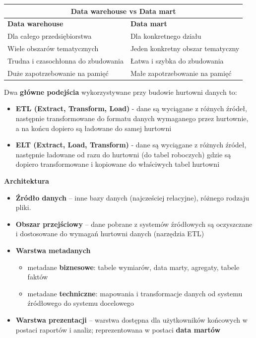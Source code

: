 \documentclass[a4paper]{article}
\begin{document}
    \begin{table}[H]
        \begin{center}
            \begin{tabular}{ |p{8cm}|p{8cm}| }
                \hline
                \multicolumn{2}{|c|}{\textbf{Data warehouse vs Data mart}}\\
                \hline
                \hline
                \textbf{Data warehouse} & \textbf{Data mart}\\
                \hline
                Dla całego przedsiębiorstwa & Dla konkretnego działu \\
                \hline
                Wiele obszarów tematycznych & Jeden konkretny obszar tematyczny \\
                \hline
                Trudna i czasochłonna do zbudowania & Łatwa i szybka do zbudowania \\
                \hline
                Duże zapotrzebowanie na pamięć & Małe zapotrzebowanie na pamięć \\
                \hline
            \end{tabular}
        \end{center}
    \end{table}

    Dwa \textbf{główne podejścia} wykorzystywane przy budowie hurtowni danych to:
    \begin{itemize}
        \item \textbf{ETL (Extract, Transform, Load)} - dane są wyciągane z różnych źródeł, następnie transformowane do formatu danych wymaganego przez hurtownie, a na końcu dopiero są ładowane do samej hurtowni
        \item \textbf{ELT (Extract, Load, Transform)} - dane są wyciągane z różnych źródeł, następnie ładowane od razu do hurtowni (do tabel roboczych) gdzie są dopiero transformowane i kopiowane do właściwych tabel hurtowni
    \end{itemize}

    \textbf{Architektura}
    \begin{itemize}
        \item \textbf{Źródło danych} – inne bazy danych (najcześciej relacyjne), różnego rodzaju pliki.
        \item \textbf{Obszar przejściowy} – dane pobrane z systemów źródłowych są oczyszczane i dostosowane do wymagań hurtowni danych (narzędzia ETL)
        \item \textbf{Warstwa metadanych}
        \begin{itemize}
            \item metadane \textbf{biznesowe}: tabele wymiarów, data marty, agregaty, tabele faktów
            \item metadane \textbf{techniczne}: mapowania i transformacje danych od systemu źródłowego do systemu docelowego
        \end{itemize}
        \item \textbf{Warstwa prezentacji} – warstwa dostępna dla użytkowników końcowych w postaci raportów i analiz; reprezentowana w postaci \textbf{data martów}
    \end{itemize}
\end{document}
